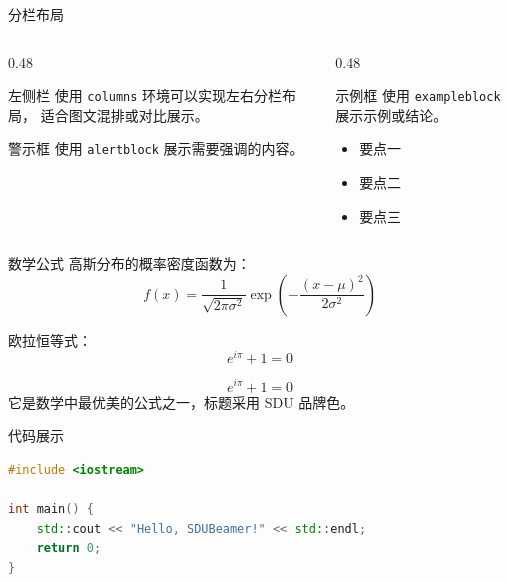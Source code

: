 \documentclass[aspectratio=169]{beamer}
\begin{document}
\begin{frame}
  \sectionpage
\end{frame}

\begin{frame}{分栏布局}
  \begin{columns}
    \begin{column}{0.48\textwidth}
      \begin{block}{左侧栏}
        使用 \texttt{columns} 环境可以实现左右分栏布局，
        适合图文混排或对比展示。
      \end{block}
      \begin{alertblock}{警示框}
        使用 \texttt{alertblock} 展示需要强调的内容。
      \end{alertblock}
    \end{column}
    \begin{column}{0.48\textwidth}
      \begin{exampleblock}{示例框}
        使用 \texttt{exampleblock} 展示示例或结论。
      \end{exampleblock}
      \begin{itemize}
        \item 要点一
        \item 要点二
        \item 要点三
      \end{itemize}
    \end{column}
  \end{columns}
\end{frame}

\begin{frame}{数学公式}
  高斯分布的概率密度函数为：
  \[
    f(x) = \frac{1}{\sqrt{2\pi\sigma^2}}
    \exp\left(-\frac{(x-\mu)^2}{2\sigma^2}\right)
  \]

  欧拉恒等式：
  \[
    e^{i\pi} + 1 = 0
  \]

  \begin{theorem}[欧拉公式]
    \[ e^{i\pi} + 1 = 0 \]
    它是数学中最优美的公式之一，标题采用 SDU 品牌色。
  \end{theorem}
\end{frame}

\begin{frame}[fragile]{代码展示}
  \begin{lstlisting}[language=C++]
#include <iostream>

int main() {
    std::cout << "Hello, SDUBeamer!" << std::endl;
    return 0;
}
  \end{lstlisting}
\end{frame}
\end{document}
